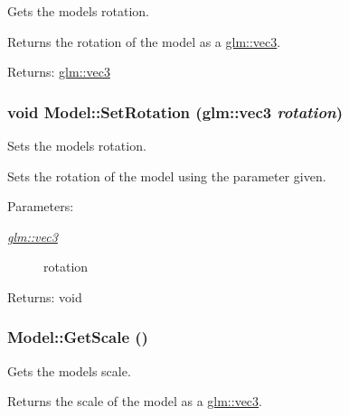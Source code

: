 Gets the models rotation. 

Returns the rotation of the model as a \hyperlink{group__core__types_g1c47e8b3386109bc992b6c48e91b0be7}{glm::vec3}.

\begin{Desc}
\item[Returns:]\hyperlink{group__core__types_g1c47e8b3386109bc992b6c48e91b0be7}{glm::vec3} \end{Desc}
\hypertarget{class_model_71aa61e54f3f12bc86175fa359079d23}{
\subsubsection[SetRotation]{\setlength{\rightskip}{0pt plus 5cm}void Model::SetRotation ({\bf glm::vec3} {\em rotation})}}
\label{class_model_71aa61e54f3f12bc86175fa359079d23}


Sets the models rotation. 

Sets the rotation of the model using the parameter given.

\begin{Desc}
\item[Parameters:]
\begin{description}
\item[{\em \hyperlink{group__core__types_g1c47e8b3386109bc992b6c48e91b0be7}{glm::vec3}}]rotation \end{description}
\end{Desc}
\begin{Desc}
\item[Returns:]void \end{Desc}
\hypertarget{class_model_1b61b8298674542ad929bf582b4de262}{
\subsubsection[GetScale]{ Model::GetScale ()}}
\label{class_model_1b61b8298674542ad929bf582b4de262}


Gets the models scale. 

Returns the scale of the model as a \hyperlink{group__core__types_g1c47e8b3386109bc992b6c48e91b0be7}{glm::vec3}.


